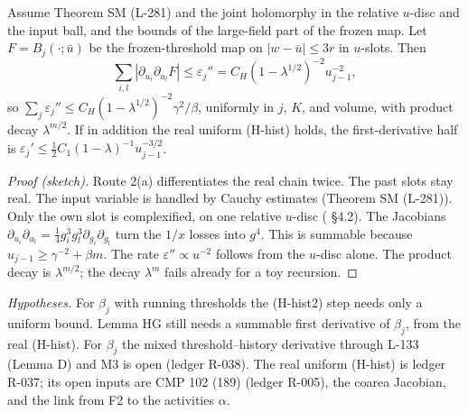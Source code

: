 \begin{proposition}\label{src:HHIST2}
Assume Theorem SM (L-281) and the joint holomorphy in the relative $u$-disc and the input ball, and the bounds of the large-field part of the frozen map. Let $F=B_j(\cdot;\bar u)$ be the frozen-threshold map on $|w-\bar u|\le3r$ in $u$-slots. Then
\[\sum_{i,l}|\partial_{u_i}\partial_{u_l}F|\le\varepsilon_j''=C_H(1-\lambda^{1/2})^{-2}u_{j-1}^{-2},\]
so $\sum_j\varepsilon_j''\le C_H(1-\lambda^{1/2})^{-2}\gamma^2/\beta$, uniformly in $j$, $K$, and volume, with product decay $\lambda^{m/2}$. If in addition the real uniform (H-hist) holds, the first-derivative half is $\varepsilon_j'\le\tfrac12C_1(1-\lambda)^{-1}u_{j-1}^{-3/2}$.
\end{proposition}
\begin{proof}[Proof (sketch)]
Route 2(a) differentiates the real chain twice. The past slots stay real. The input variable is handled by Cauchy estimates (Theorem SM (L-281)). Only the own slot is complexified, on one relative $u$-disc ( \S4.2). The Jacobians $\partial_{u_i}\partial_{u_l}=\tfrac14g_i^3g_l^3\partial_{g_i}\partial_{g_l}$ turn the $1/x$ losses into $g^4$. This is summable because $u_{j-1}\ge\gamma^{-2}+\beta m$. The rate $\varepsilon''\propto u^{-2}$ follows from the $u$-disc alone. The product decay is $\lambda^{m/2}$; the decay $\lambda^m$ fails already for a toy recursion.
\end{proof}
\emph{Hypotheses.} For $\beta_j$ with running thresholds the (H-hist2) step needs only a uniform bound. Lemma HG still needs a summable first derivative of $\beta_j$, from the real (H-hist). For $\beta_j$ the mixed threshold--history derivative through L-133 (Lemma D) and M3 is open (ledger R-038). The real uniform (H-hist) is ledger R-037; its open inputs are CMP 102 (189) (ledger R-005), the coarea Jacobian, and the link from F2 to the activities $\alpha$.

